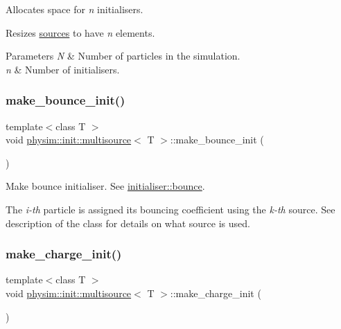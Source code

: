 Allocates space for {\itshape n} initialisers. 

Resizes \hyperlink{classphysim_1_1init_1_1multisource_ad16d3a372efb23d3975df960a54f4dc1}{sources} to have {\itshape n} elements. 
\begin{DoxyParams}{Parameters}
{\em N} & Number of particles in the simulation. \\
\hline
{\em n} & Number of initialisers. \\
\hline
\end{DoxyParams}
\mbox{\label{classphysim_1_1init_1_1multisource_ad994252de40d3c0affb068cc2f2d645e}} 
\subsubsection{\texorpdfstring{make\+\_\+bounce\+\_\+init()}{make\_bounce\_init()}}
{\footnotesize\ttfamily template$<$class T $>$ \\
void \hyperlink{classphysim_1_1init_1_1multisource}{physim\+::init\+::multisource}$<$ T $>$\+::make\+\_\+bounce\+\_\+init (\begin{DoxyParamCaption}{ }\end{DoxyParamCaption})}



Make bounce initialiser. See \hyperlink{classphysim_1_1init_1_1initialiser_ad8917d57b62f13ffb6cff24d39b4d360}{initialiser\+::bounce}. 

The {\itshape i-\/th} particle is assigned its bouncing coefficient using the {\itshape k-\/th} source. See description of the class for details on what source is used. \mbox{\label{classphysim_1_1init_1_1multisource_a9118fc38926eab79955cb02a8b27284f}} 
\subsubsection{\texorpdfstring{make\+\_\+charge\+\_\+init()}{make\_charge\_init()}}
{\footnotesize\ttfamily template$<$class T $>$ \\
void \hyperlink{classphysim_1_1init_1_1multisource}{physim\+::init\+::multisource}$<$ T $>$\+::make\+\_\+charge\+\_\+init (\begin{DoxyParamCaption}{ }\end{DoxyParamCaption})}




